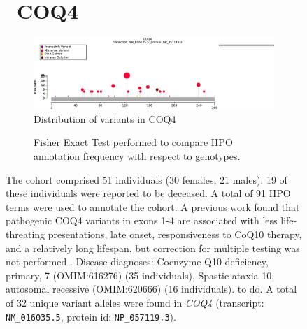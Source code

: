 \begin{figure}[htbp]
\section*{ COQ4}
\centering
\begin{subfigure}[b]{0.95\textwidth}
\centering
\includegraphics[width=\textwidth]{img/COQ4_protein_diagram.pdf} 
\captionsetup{justification=raggedright,singlelinecheck=false}
\caption{Distribution of variants in COQ4}
\end{subfigure}

\vspace{2em}

\begin{subfigure}[b]{0.95\textwidth}
\centering
{}
\captionsetup{justification=raggedright,singlelinecheck=false}
\caption{Fisher Exact Test performed to compare HPO annotation frequency with respect to genotypes. }
\end{subfigure}

\vspace{2em}

\caption{The cohort comprised 51 individuals (30 females, 21 males). 19 of these individuals were reported to be deceased.
A total of 91 HPO terms were used to annotate the cohort. 
A previous work found that pathogenic COQ4 variants in exons 1-4
are associated with less life-threating presentations, late onset, responsiveness to CoQ10 therapy,
and a relatively long lifespan, but correction for multiple testing was not performed \cite{PMID_35154243}.
Disease diagnoses: Coenzyme Q10 deficiency, primary, 7 (OMIM:616276) (35 individuals), Spastic ataxia 10, autosomal recessive (OMIM:620666) (16 individuals). to do. A total of 32 unique variant alleles were found in \textit{COQ4} (transcript: \texttt{NM\_016035.5}, protein id: \texttt{NP\_057119.3}).}
\end{figure}
